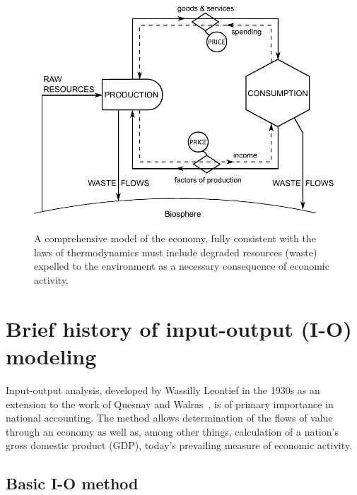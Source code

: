 \begin{figure}[!ht]
\centering\
\includegraphics[width=\linewidth]{Part_0/Chapter_Introduction/images/PERKS.pdf}
\caption[A comprehensive biophysical (?) model of the economy]{A comprehensive model 
of the economy, fully consistent with the laws of thermodynamics 
must include degraded resources (waste) expelled 
to the environment as a necessary consequence of economic activity.}
\label{fig:metabolic_economy}
\end{figure}


\section{Brief history of input-output (I-O) modeling}
\label{sec:history}

Input-output analysis, developed by Wassilly Leontief in the 1930s 
as an extension to the work of Quesnay and Walras~\cite{Leontief1936}, 
is of primary importance in national accounting. 
The method allows determination of the flows of value through
an economy as well as, 
among other things, 
calculation of a nation's gross domestic product (GDP), 
today's prevailing measure of economic activity.



\subsection{Basic I-O method}
\label{sec:IO_basic}

